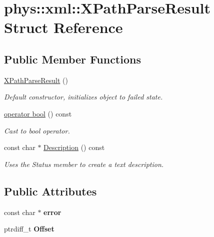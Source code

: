 \hypertarget{structphys_1_1xml_1_1XPathParseResult}{
\section{phys::xml::XPathParseResult Struct Reference}
\label{d8/d54/structphys_1_1xml_1_1XPathParseResult}
}
\subsection*{Public Member Functions}
\begin{DoxyCompactItemize}
\item 
\hypertarget{structphys_1_1xml_1_1XPathParseResult_ac41f4db5604d32679933be58bc74aa23}{
\hyperlink{structphys_1_1xml_1_1XPathParseResult_ac41f4db5604d32679933be58bc74aa23}{XPathParseResult} ()}
\label{d8/d54/structphys_1_1xml_1_1XPathParseResult_ac41f4db5604d32679933be58bc74aa23}

\begin{DoxyCompactList}\small\item\em Default constructor, initializes object to failed state. \item\end{DoxyCompactList}\item 
\hyperlink{structphys_1_1xml_1_1XPathParseResult_a8dddf12100a6c40f9abcd8c0b7b37816}{operator bool} () const 
\begin{DoxyCompactList}\small\item\em Cast to bool operator. \item\end{DoxyCompactList}\item 
const char $\ast$ \hyperlink{structphys_1_1xml_1_1XPathParseResult_a722e220fa91f9bc48357ade351b8b038}{Description} () const 
\begin{DoxyCompactList}\small\item\em Uses the Status member to create a text description. \item\end{DoxyCompactList}\end{DoxyCompactItemize}
\subsection*{Public Attributes}
\begin{DoxyCompactItemize}
\item 
\hypertarget{structphys_1_1xml_1_1XPathParseResult_ad496c6f03c4664aacd024ac20afc76b7}{
const char $\ast$ {\bfseries error}}
\label{d8/d54/structphys_1_1xml_1_1XPathParseResult_ad496c6f03c4664aacd024ac20afc76b7}

\item 
\hypertarget{structphys_1_1xml_1_1XPathParseResult_acd023d00ea85eb8adbc0a8f4e9d5c7e9}{
ptrdiff\_\-t {\bfseries Offset}}
\label{d8/d54/structphys_1_1xml_1_1XPathParseResult_acd023d00ea85eb8adbc0a8f4e9d5c7e9}

\end{DoxyCompactItemize}


